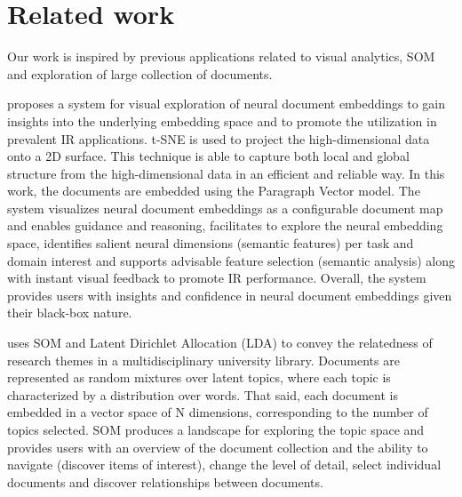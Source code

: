 \documentclass[a4paper]{article}
\begin{document}
\section*{Related work}
Our work is inspired by previous applications related to visual analytics, SOM and exploration of large collection of documents.

\citet{ji2019} proposes a system for visual exploration of neural document embeddings to gain insights into the underlying embedding space and to promote the utilization in prevalent IR applications. t-SNE is used to project the high-dimensional data onto a 2D surface. This technique is able to capture both local and global structure from the high-dimensional data in an efficient and reliable way. In this work, the documents are embedded using the Paragraph Vector model. The system visualizes neural document embeddings as a configurable document map and enables guidance and reasoning, facilitates to explore the neural embedding space, identifies salient neural dimensions (semantic features) per task and domain interest and supports advisable feature selection (semantic analysis) along with instant visual feedback to promote IR performance. Overall, the system provides users with insights and confidence in neural document embeddings given their black-box nature.

\citet{lafia2019} uses SOM and Latent Dirichlet Allocation (LDA) to convey the relatedness of research themes in a multidisciplinary university library. Documents are represented as random mixtures over latent topics, where each topic is characterized by a distribution over words. That said, each document is embedded in a vector space of N dimensions, corresponding to the number of topics selected. SOM produces a landscape for exploring the topic space and provides users with an overview of the document collection and the ability to navigate (discover items of interest), change the level of detail, select individual documents and discover relationships between documents.
\end{document}
